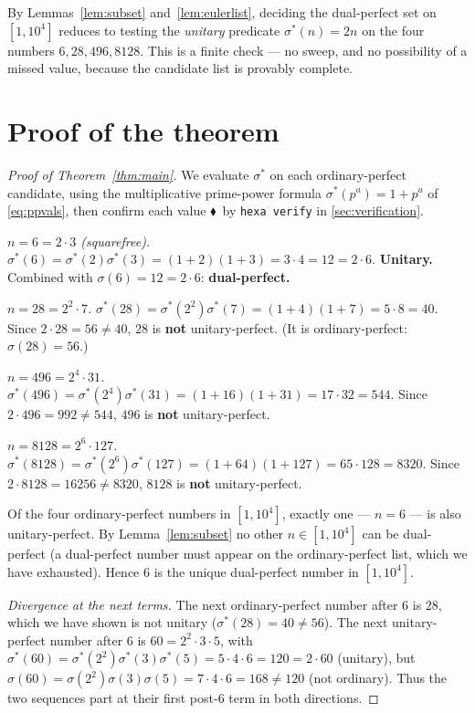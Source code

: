 \documentclass[11pt,a4paper]{article}
\newcommand{\sig}{\sigma}
\newcommand{\sigs}{\sigma^{*}}
\newcommand{\formal}{\textcolor{blue!60!black}{$\blacklozenge$}}
\theoremstyle{plain}
\theoremstyle{definition}
\begin{document}
\noindent By Lemmas~\ref{lem:subset} and~\ref{lem:eulerlist}, deciding the
dual-perfect set on $[1,10^4]$ reduces to testing the \emph{unitary} predicate
$\sigs(n)=2n$ on the four numbers $6,28,496,8128$. This is a finite check --- no
sweep, and no possibility of a missed value, because the candidate list is
provably complete.

\section{Proof of the theorem}
\label{sec:proof}

\begin{proof}[Proof of Theorem~\ref{thm:main}]
We evaluate $\sigs$ on each ordinary-perfect candidate, using the multiplicative
prime-power formula $\sigs(p^a)=1+p^a$ of \eqref{eq:ppvals}, then confirm each
value \formal\ by \texttt{hexa verify} in \textsection\ref{sec:verification}.

\smallskip\noindent\emph{$n=6=2\cdot3$ (squarefree).}
$\sigs(6)=\sigs(2)\sigs(3)=(1+2)(1+3)=3\cdot4=12=2\cdot6$. \textbf{Unitary.}
Combined with $\sig(6)=12=2\cdot6$: \textbf{dual-perfect.}

\smallskip\noindent\emph{$n=28=2^2\cdot7$.}
$\sigs(28)=\sigs(2^2)\sigs(7)=(1+4)(1+7)=5\cdot8=40$. Since $2\cdot28=56\neq40$,
$28$ is \textbf{not} unitary-perfect. (It is ordinary-perfect: $\sig(28)=56$.)

\smallskip\noindent\emph{$n=496=2^4\cdot31$.}
$\sigs(496)=\sigs(2^4)\sigs(31)=(1+16)(1+31)=17\cdot32=544$. Since
$2\cdot496=992\neq544$, $496$ is \textbf{not} unitary-perfect.

\smallskip\noindent\emph{$n=8128=2^6\cdot127$.}
$\sigs(8128)=\sigs(2^6)\sigs(127)=(1+64)(1+127)=65\cdot128=8320$. Since
$2\cdot8128=16256\neq8320$, $8128$ is \textbf{not} unitary-perfect.

\smallskip\noindent Of the four ordinary-perfect numbers in $[1,10^4]$, exactly
one --- $n=6$ --- is also unitary-perfect. By Lemma~\ref{lem:subset} no other
$n\in[1,10^4]$ can be dual-perfect (a dual-perfect number must appear on the
ordinary-perfect list, which we have exhausted). Hence $6$ is the unique
dual-perfect number in $[1,10^4]$.

\smallskip\noindent\emph{Divergence at the next terms.} The next
ordinary-perfect number after $6$ is $28$, which we have shown is not unitary
($\sigs(28)=40\neq56$). The next unitary-perfect number after $6$ is $60=
2^2\cdot3\cdot5$, with $\sigs(60)=\sigs(2^2)\sigs(3)\sigs(5)=5\cdot4\cdot6=120=
2\cdot60$ (unitary), but $\sig(60)=\sig(2^2)\sig(3)\sig(5)=7\cdot4\cdot6=168\neq
120$ (not ordinary). Thus the two sequences part at their first post-$6$ term in
both directions. \qedhere
\end{proof}
\end{document}
